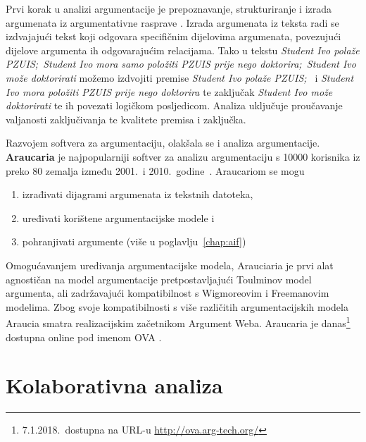 Prvi korak u analizi argumentacije je prepoznavanje, strukturiranje i 
izrada argumenata iz argumentativne rasprave \citep{scheuer2010computer,
prudencio2005visualizing}. Izrada argumenata iz teksta
radi se izdvajajući tekst koji odgovara
specifičnim dijelovima argumenata, 
povezujući dijelove argumenta ih odgovarajućim relacijama. 
Tako u tekstu \emph{Student
Ivo polaže PZUIS;\ Student Ivo mora samo položiti PZUIS prije nego doktorira;\ Student
Ivo može doktorirati} možemo izdvojiti premise \emph{Student
Ivo polaže PZUIS;\ 
} i 
\emph{Student
Ivo mora položiti PZUIS prije nego doktorira
} te zaključak
\emph{Student Ivo može doktorirati} te ih povezati 
logičkom posljedicom. Analiza uključuje 
proučavanje valjanosti zaključivanja te
kvalitete premisa i zaključka.

Razvojem softvera za argumentaciju, 
olakšala se i analiza argumentacije. \textbf{Araucaria}
je najpopularniji softver za analizu argumentaciju s 10000 korisnika iz
preko 80 zemalja između 2001.\ i 2010.\ 
godine~\citep{Chris2017-REETAW}. Araucariom se mogu
\begin{enumerate}
\item izrađivati dijagrami argumenata iz tekstnih datoteka,
\item uređivati korištene argumentacijske modele i 
\item pohranjivati argumente (više u poglavlju~\ref{chap:aif})
\end{enumerate}
Omogućavanjem uređivanja argumentacijske modela, Arauciaria
je prvi alat agnostičan na model argumentacije
pretpostavljajući Toulminov model argumenta, ali zadržavajući kompatibilnost
s Wigmoreovim \citep{wigmore2016wigmore} i 
Freemanovim \citep{freeman1991dialectics} modelima. 
Zbog svoje kompatibilnosti s više različitih argumentacijskih 
modela Araucia smatra realizacijskim začetnikom Argument Weba.
Araucaria je 
danas\footnote{7.1.2018.\ dostupna na URL-u \url{http://ova.arg-tech.org/}} 
dostupna online pod imenom OVA . 

\section{Kolaborativna analiza}

